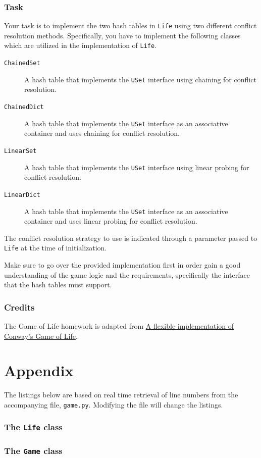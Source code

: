 \documentclass[addpoints]{exam}
\begin{document}
\section{Task}

Your task is to implement the two hash tables in \texttt{Life} using two different conflict resolution methods. Specifically, you have to implement the following classes which are utilized in the implementation of \texttt{Life}.
\begin{description}
\item[\texttt{ChainedSet}] A hash table that implements the \texttt{USet} interface using chaining for conflict resolution.
\item[\texttt{ChainedDict}] A hash table that implements the \texttt{USet} interface as an associative container and uses chaining for conflict resolution.
\item[\texttt{LinearSet}] A hash table that implements the \texttt{USet} interface using linear probing for conflict resolution.
\item[\texttt{LinearDict}] A hash table that implements the \texttt{USet} interface as an associative container and uses linear probing for conflict resolution.
\end{description}
The conflict resolution strategy to use is indicated through a parameter passed to \texttt{Life} at the time of initialization.

Make sure to go over the provided implementation first in order gain a good understanding of the game logic and the requirements, specifically the interface that the hash tables must support.
  
\section*{Credits}

The Game of Life homework is adapted from \href{https://www.refsmmat.com/posts/2016-01-25-conway-game-of-life.html}{A flexible implementation of Conway's Game of Life}.

\newpage

\appendix
\part*{Appendix}
The listings below are based on real time retrieval of line numbers from the accompanying file, \texttt{game.py}. Modifying the file will change the listings.

\section{The \texttt{Life} class}


\section{The \texttt{Game} class}

\end{document}
